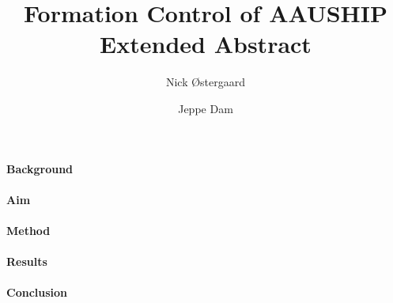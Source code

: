 \documentclass[a4paper,12pt]{article}
\begin{document}
\title{\vspace{-2cm}Formation Control of AAUSHIP\\
\vspace{0.3cm}\small{Extended Abstract}}
\author{Nick Østergaard \and Jeppe Dam}
\maketitle


\paragraph{Background}
\lipsum[5]

\paragraph{Aim}
\lipsum[1]

\paragraph{Method}
\lipsum[2]

\paragraph{Results}
\lipsum[3]

\paragraph{Conclusion}
\lipsum[4]
\end{document}
